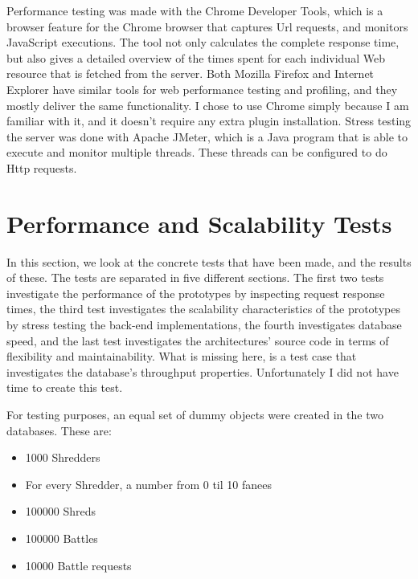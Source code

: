 Performance testing was made with the Chrome Developer Tools, \cite{chrome} which is a browser feature for the Chrome browser that captures Url requests, and monitors JavaScript executions. The tool not only calculates the complete response time, but also gives a detailed overview of the times spent for each individual Web resource that is fetched from the server. Both Mozilla Firefox and Internet Explorer have similar tools for web performance testing and profiling, and they mostly deliver the same functionality. I chose to use Chrome simply because I am familiar with it, and it doesn't require any extra plugin installation. 
Stress testing the server was done with Apache JMeter, which is a Java program that is able to execute and monitor multiple threads. These threads can be configured to do Http requests.

\section{Performance and Scalability Tests}
In this section, we look at the concrete tests that have been made, and the results of these. The tests are separated in five different sections. The first two tests investigate the performance of the prototypes by inspecting request response times, the third test investigates the scalability characteristics of the prototypes by stress testing the back-end implementations, the fourth investigates database speed, and the last test investigates the architectures' source code in terms of flexibility and maintainability. What is missing here, is a test case that investigates the database's throughput properties. Unfortunately I did not have time to create this test. 

For testing purposes, an equal set of dummy objects were created in the two databases. These are:
\begin{itemize}
\item{} 1000 Shredders 
\item{} For every Shredder, a number from 0 til 10 fanees
\item{} 100000 Shreds
\item{} 100000 Battles
\item{} 10000 Battle requests
\end{itemize}

